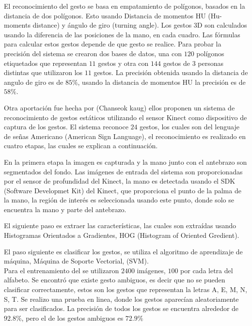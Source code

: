 El reconocimiento del gesto se basa en empatamiento de polígonos, basados en la distancia de dos polígonos. Esto usando Distancia de momentos HU (Hu-moments distance) y ángulo de giro (turning angle). 
Los gestos 3D son calculados usando la diferencia de las posiciones de la mano, en cada cuadro. Las fórmulas para calcular estos gestos depende de que gesto se  realice.  
Para probar la precisión del sistema se crearon dos bases de datos, una con $120$ polígonos etiquetados que representan $11$ gestos y otra con $144$ gestos de $3$ personas distintas que utilizaron los $11$ gestos. La precisión obtenida usando la distancia de angulo de giro es de $85 \%$, usando la distancia de momentos HU la precisión es de $58 \%$.  


Otra aportación fue hecha por (Chanseok kaug) ellos proponen un sistema de reconocimiento de  gestos estáticos utilizando el sensor Kinect como dispositivo de captura de los gestos. El sistema reconoce $24$ gestos, los cuales son del lenguaje de señas Americano (American Sign Language), el reconocimiento es realizado en cuatro etapas, las cuales se explican a continuación.  

En la primera etapa la imagen es capturada y la mano junto con el antebrazo son segmentados del fondo. Las imágenes de entrada del sistema son proporcionadas por el sensor de profundidad del Kinect, la mano es detectada usando el SDK (Software Developmet Kit) del Kinect, que proporciona el punto de la palma de la mano, la región de interés es seleccionada usando este punto, donde  solo se encuentra la mano y parte del antebrazo.   

El siguiente paso es extraer las características, las cuales son extraídas usando Histogramas Orientados a Gradientes, HOG (Histogram of Oriented Gredient).  

El paso siguiente es clasificar los gestos, se utiliza el algoritmo de aprendizaje de máquina, Máquina de Soporte Vectorial, (SVM).\\
Para el entrenamiento del se utilizaron $2400$ imágenes, $100$ por cada letra del alfabeto. Se encontró que existe gesto ambiguos, es decir que no se pueden clasificar correctamente, estos son los gestos que representan la letras A, E, M, N, S, T. 
Se realizo una prueba en linea, donde los gestos aparecían aleatoriamente para ser clasificados. La precisión de todos los gestos se encuentra alrededor de $92.8 \%$, pero el de los gestos ambiguos es $72.9 \%$


